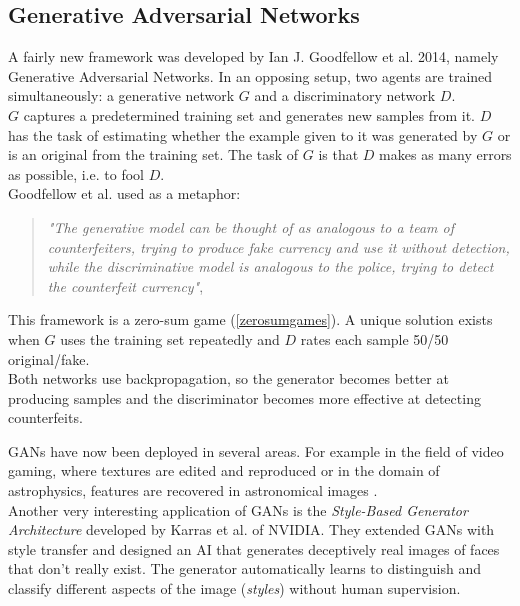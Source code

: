 \subsection{Generative Adversarial Networks}
\label{gans}
\begin{comment}

    -look at gradient descent --> adjust weights in specific direction, move down the gradient
    - discriminator (classifier) (supervised learning) (0-1) fake or real?
        --> if discriminator says fake -> negative reward for generator
    - generator (random noise) -> generates new sample
    --> competetive game (one wants error rate to be high - one wants it to be low)

    - as the descriminator gets better, the generator has to get better aswell
\end{comment}

A fairly new framework was developed by Ian J. Goodfellow et al. \cite{gansgoodfellow2014generative} 2014, namely Generative Adversarial Networks. 
In an opposing setup, two agents are trained simultaneously: a generative network $G$ and a discriminatory network $D$. \\
$G$ captures a predetermined training set and generates new samples from it. $D$ has the task of estimating whether the example given to it was generated by $G$ or is an original from the training set. The task of $G$ is that $D$ makes as many errors as possible, i.e. to fool $D$.\\
Goodfellow et al. used as a metaphor:
\begin{quote}
\textit{"The generative model can be thought of as analogous to a team of counterfeiters, trying to produce fake currency and use it without detection, while the discriminative model is analogous to the police, trying to detect the counterfeit currency"}, \cite{gansgoodfellow2014generative}
\end{quote}{}

This framework is a zero-sum game (\ref{zerosumgames}). A unique solution exists when $G$ uses the training set repeatedly and $D$ rates each sample 50/50 original/fake.\\
Both networks use backpropagation, so the generator becomes better at producing samples and the discriminator becomes more effective at detecting counterfeits.

GANs have now been deployed in several areas. For example in the field of video gaming, where textures are edited and reproduced \cite{resolutionGANWang2018Sep} or in the domain of astrophysics, features are recovered in astronomical images \cite{astroGANSchawinski2017Feb}.\\
Another very interesting application of GANs is the \textit{Style-Based Generator Architecture} developed by Karras et al. of NVIDIA. They extended GANs with style transfer and designed an AI that generates deceptively real images of faces that don't really exist. The generator automatically learns to distinguish and classify different aspects of the image (\textit{styles}) without human supervision. 
